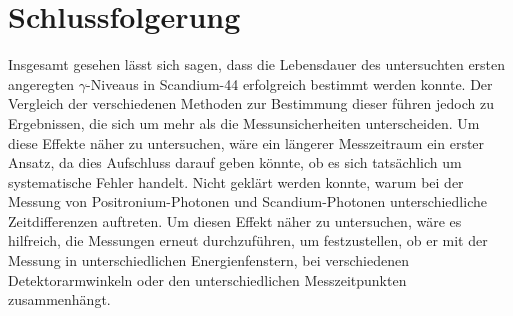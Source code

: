 \documentclass[
	a4paper,
	12pt,
	pagesize,
	ngerman
]{scrartcl}
\begin{document}
	\section{Schlussfolgerung}
	Insgesamt gesehen lässt sich sagen, dass die Lebensdauer des untersuchten ersten angeregten $\gamma$-Niveaus in Scandium-44 erfolgreich bestimmt werden konnte.
	Der Vergleich der verschiedenen Methoden zur Bestimmung dieser führen jedoch zu Ergebnissen, die sich um mehr als die Messunsicherheiten unterscheiden.
	Um diese Effekte näher zu untersuchen, wäre ein längerer Messzeitraum ein erster Ansatz, da dies Aufschluss darauf geben könnte, ob es sich tatsächlich um systematische Fehler handelt.
	Nicht geklärt werden konnte, warum bei der Messung von Positronium-Photonen und Scandium-Photonen unterschiedliche Zeitdifferenzen auftreten.
	Um diesen Effekt näher zu untersuchen, wäre es hilfreich, die Messungen erneut durchzuführen, um festzustellen, ob er mit der Messung in unterschiedlichen Energienfenstern, bei verschiedenen Detektorarmwinkeln oder den unterschiedlichen Messzeitpunkten zusammenhängt.

	\printbibliography %
\end{document}
